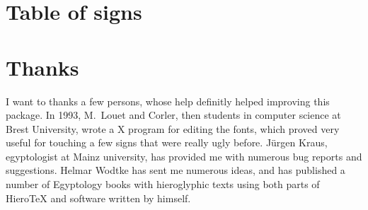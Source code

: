 \documentclass[final]{article}
\begin{document}
\begin{hieroglyph}
{\HinterSignsSpace
{}\HinterSignsSpace
{}\HinterSignsSpace
{}\HinterSignsSpace
{}\HinterSignsSpace
{}\HwordSpace
{}\HinterSignsSpace
{}\HinterSignsSpace
{}\HinterSignsSpace
{}\HinterSignsSpace
{}\HinterSignsSpace
{}\HinterSignsSpace
{}\HinterSignsSpace
{}\HinterSignsSpace
{}\HinterSignsSpace
{}\HinterSignsSpace
{}\HinterSignsSpace
{}\HinterSignsSpace
{}\HinterSignsSpace
{}\HinterSignsSpace
{}\HinterSignsSpace
{}\HinterSignsSpace
{}\HinterSignsSpace
{}\HinterSignsSpace
{}\HinterSignsSpace
{}\HinterSignsSpace
{}\HinterSignsSpace
{}\HinterSignsSpace
{}\HwordSpace
{}\HinterSignsSpace
{}\HinterSignsSpace
{}}\end{hieroglyph}


\section{Table of signs}
\label{sec:signes}


\def\showHvalue#1#2{\hbox to 0.33\textwidth{#1\hfil
    #2\hfil}\linebreak[3]%
  \hskip 0.1mm  plus 1cm minus 1cm}
\EnPetit{\small
\noindent{}
}
\section{Thanks}
I want to thanks a few persons, whose help definitly helped improving
this package.  In 1993, M.~Louet and Corler, then students in computer
science at Brest University, wrote a X program for editing the fonts,
which proved very useful for touching a few signs that were really
ugly before. J\"urgen Kraus, egyptologist at Mainz university, has
provided me with numerous bug reports and suggestions. Helmar Wodtke
has sent me numerous ideas, and has published a number of Egyptology
books with hieroglyphic texts using both parts of Hiero\TeX{} and
software written by himself.

 

\end{document}

